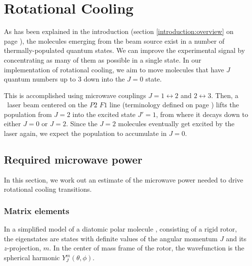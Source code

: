 \section{Rotational Cooling}
\label{RC_chapter}

As has been explained in the introduction (section \ref{introduction:overview}
on page \pageref{introduction:overview}), the molecules emerging from the beam
source exist in a number of thermally-populated quantum states. We can improve
the experimental signal by concentrating as many of them as possible in a single
state. In our implementation of rotational cooling, we aim to move molecules
that have $J$ quantum numbers up to 3 down into the $J=0$ state.

This is accomplished using microwave couplings $J=1\leftrightarrow2$ and
$2\leftrightarrow3$. Then, a \UV\ laser beam centered on the $P2$ $F1$ line
(terminology defined on page \pageref{P2F1}) lifts the population from $J=2$
into the excited state $J'=1$, from where it decays down to either $J=0$ or
$J=2$. Since the $J=2$ molecules eventually get excited by the laser again, we
expect the population to accumulate in $J=0$.

\subsection{Required microwave power}

In this section, we work out an estimate of the microwave power needed to drive
rotational cooling transitions.

\subsubsection{Matrix elements}

In a simplified model of a diatomic polar molecule
\cite[sect~7.6]{budker2004atomic}, consisting of a rigid rotor, the eigenstates
are states with definite values of the angular momentum $J$ and its
$z$-projection, $m$. In the center of mass frame of the rotor, the wavefunction
is the spherical harmonic $Y_J^m(\theta,\phi)$.


